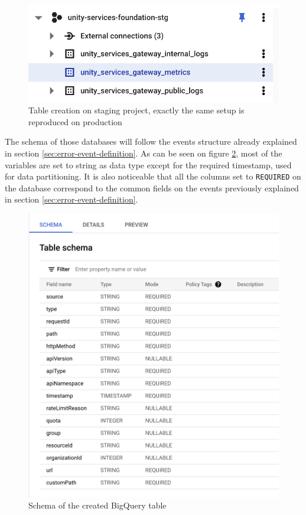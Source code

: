 \documentclass[english, 12pt, a4paper, sci, utf8, a-1b, online]{aaltothesis}
\begin{document}
\begin{figure}[h!]
    \centering
    \includegraphics[scale=0.3]{src/thesis/img/technical-solution/table-creation.png}
    \caption{Table creation on staging project, exactly the same setup is reproduced on production}
    \label{fig:bigquery-creation}
\end{figure}

The schema of those databases will follow the events structure already explained in section \ref{sec:error-event-definition}. As can be seen on figure \ref{fig:bigquery-schema}, most of the variables are set to string as data type except for the required timestamp, used for data partitioning. It is also noticeable that all the columns set to \texttt{REQUIRED} on the database correspond to the common fields on the events previously explained in section \ref{sec:error-event-definition}. \\

\begin{figure}[h!]
    \centering
    \includegraphics[scale=0.3]{src/thesis/img/technical-solution/bigquery-schema.png}
    \caption{Schema of the created BigQuery table}
    \label{fig:bigquery-schema}
\end{figure}
\end{document}
